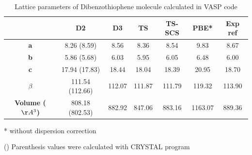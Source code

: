  	
 	\begin{table}[H]
 		\caption{Lattice parameters of Dibenzothiophene molecule calculated in VASP code} \label{table-dibenzothiophenesol}
 		\begin{center}
 			\begin{threeparttable}
 				\begin{tabular}{c c c c c c c}
 					\toprule
 					& \textbf{D2} & \textbf{D3} & \textbf{TS} & \textbf{TS-SCS} & \textbf{PBE*} & \textbf{Exp} ref\cite{schaffrin1970structure}\\
 					\midrule
 					\textbf{a} &  8.26 (8.59) & 8.56 & 8.36 & 8.54 & 9.83 & 8.67\\
 					\textbf{b}&5.86 (5.68)  & 6.03 & 5.95 & 6.05 & 6.48 & 6.00\\
 					\textbf{c}& 17.94 (17.83) & 18.44 & 18.04 & 18.39 & 20.95 & 18.70\\
 					\textbf{$\beta$} & 111.54 (112.66) & 112.07 & 111.87& 111.79& 119.32 & 113.90 \\
 					\textbf{Volume ($\AA^{3}$)}&808.18 (802.53) &882.92 &847.06  & 883.16 & 1163.07 & 889.36\\
 					\bottomrule
 				\end{tabular}
 				
 				\begin{tablenotes}
 					\item[*] without dispersion correction
 					\item[()] Parenthesis values were calculated with CRYSTAL program
 				\end{tablenotes}
 			\end{threeparttable}
 		\end{center}
 	\end{table}
 


